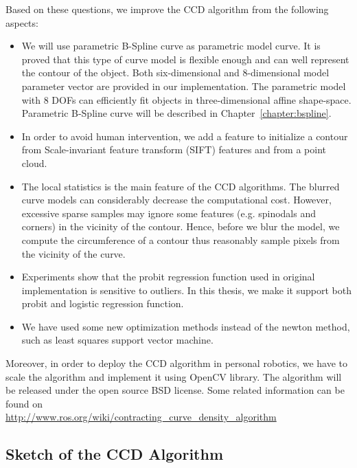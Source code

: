 Based on these questions, we improve the CCD algorithm from the
following aspects:
\begin{itemize}
\item We will use parametric B-Spline curve as
parametric model curve. It is proved that this type of curve model is
flexible enough and can well represent the contour of the
object. Both six-dimensional and 8-dimensional model parameter vector
are provided in our implementation. The parametric model with 8 DOFs
can efficiently fit objects in three-dimensional affine
shape-space. Parametric B-Spline curve will be described in Chapter~\ref{chapter:bspline}.
\item In order to avoid human intervention, we add a feature to 
  initialize a contour from Scale-invariant feature transform (SIFT)
  features and from a point cloud.
\item The local statistics is the main feature of the CCD
  algorithms. The blurred curve models can considerably decrease the
  computational cost. However, excessive sparse samples may ignore some
  features (e.g. spinodals and corners) in the vicinity of the contour. Hence, before we blur the
  model, we compute the circumference of a contour thus reasonably
  sample pixels from the vicinity of the curve.
\item Experiments show that the probit regression function used
  in original implementation is sensitive to outliers. In this
  thesis, we make it support both probit and logistic regression
  function.
\item We have used some new optimization methods instead of the
  newton method, such as least squares support vector machine.
\end{itemize}


Moreover, in order to deploy the CCD algorithm in personal robotics,
we have to scale the algorithm and implement it using OpenCV library.
The algorithm will be released under the open source BSD license. Some
related information can be found on\\
\url{http://www.ros.org/wiki/contracting\_curve\_density\_algorithm}

\subsection{Sketch of the CCD Algorithm}
\label{sec:sccd}

